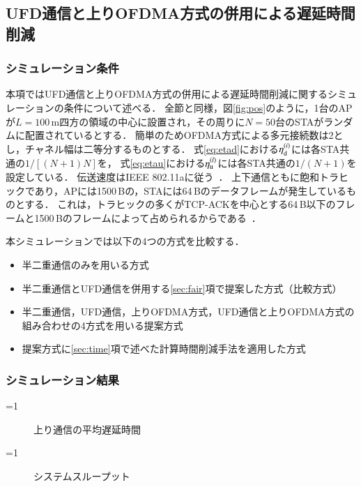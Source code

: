 \documentclass[master]{kuisthesis}		%
\newcounter{flagFig}
\begin{document}
	\subsection{UFD通信と上りOFDMA方式の併用による遅延時間削減}
		\subsubsection{シミュレーション条件}
			本項ではUFD通信と上りOFDMA方式の併用による遅延時間削減に関するシミュレーションの条件について述べる．
			全節と同様，図\ref{fig:pos}のように，1台のAPが$L=100$\,m四方の領域の中心に設置され，その周りに$N=50$台のSTAがランダムに配置されているとする．
			簡単のためOFDMA方式による多元接続数は2とし，チャネル幅は二等分するものとする．
			式\eqref{eq:etad}における$\eta_{\rm d}^{(i)}$には各STA共通の$1/[(N+1)N]$を，
			式\eqref{eq:etau}における$\eta_{\rm u}^{(l)}$には各STA共通の$1/(N+1)$を設定している．
			伝送速度はIEEE 802.11aに従う~\cite{stda}．
			上下通信ともに飽和トラヒックであり，APには1500\,Bの，STAには64\,Bのデータフレームが発生しているものとする．
			これは，トラヒックの多くがTCP-ACKを中心とする64\,B以下のフレームと1500\,Bのフレームによって占められるからである~\cite{traffic}．
			\par
			本シミュレーションでは以下の4つの方式を比較する．
			\begin{itemize}
				\item 半二重通信のみを用いる方式
				\item 半二重通信とUFD通信を併用する\ref{sec:fair}項で提案した方式（比較方式）
				\item 半二重通信，UFD通信，上りOFDMA方式，UFD通信と上りOFDMA方式の組み合わせの4方式を用いる提案方式
				\item 提案方式に\ref{sec:time}項で述べた計算時間削減手法を適用した方式
			\end{itemize}

		\subsubsection{シミュレーション結果}
			\ifnum\value{flagFig}=1 {\begin{figure}[htbp]
				\centering
				\caption{上り通信の平均遅延時間}
				\label{fig:delay}
				\end{figure}}\fi
			\ifnum\value{flagFig}=1 {\begin{figure}[htbp]
				\centering
				\caption{システムスループット}
				\label{fig:thr}
			\end{figure}}\fi
\end{document}
